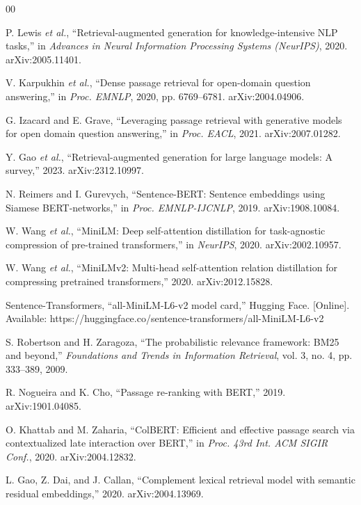 \documentclass[conference]{IEEEtran}
\begin{document}
\begin{thebibliography}{00}
\footnotesize

 P. Lewis \emph{et al.}, ``Retrieval-augmented generation for knowledge-intensive NLP tasks,'' in \emph{Advances in Neural Information Processing Systems (NeurIPS)}, 2020. arXiv:2005.11401.

 V. Karpukhin \emph{et al.}, ``Dense passage retrieval for open-domain question answering,'' in \emph{Proc. EMNLP}, 2020, pp. 6769--6781. arXiv:2004.04906.

 G. Izacard and E. Grave, ``Leveraging passage retrieval with generative models for open domain question answering,'' in \emph{Proc. EACL}, 2021. arXiv:2007.01282.

 Y. Gao \emph{et al.}, ``Retrieval-augmented generation for large language models: A survey,'' 2023. arXiv:2312.10997.

 N. Reimers and I. Gurevych, ``Sentence-BERT: Sentence embeddings using Siamese BERT-networks,'' in \emph{Proc. EMNLP-IJCNLP}, 2019. arXiv:1908.10084.

 W. Wang \emph{et al.}, ``MiniLM: Deep self-attention distillation for task-agnostic compression of pre-trained transformers,'' in \emph{NeurIPS}, 2020. arXiv:2002.10957.

 W. Wang \emph{et al.}, ``MiniLMv2: Multi-head self-attention relation distillation for compressing pretrained transformers,'' 2020. arXiv:2012.15828.

 Sentence-Transformers, ``all-MiniLM-L6-v2 model card,'' Hugging Face. [Online]. Available: https://huggingface.co/sentence-transformers/all-MiniLM-L6-v2

 S. Robertson and H. Zaragoza, ``The probabilistic relevance framework: BM25 and beyond,'' \emph{Foundations and Trends in Information Retrieval}, vol. 3, no. 4, pp. 333--389, 2009.

 R. Nogueira and K. Cho, ``Passage re-ranking with BERT,'' 2019. arXiv:1901.04085.

 O. Khattab and M. Zaharia, ``ColBERT: Efficient and effective passage search via contextualized late interaction over BERT,'' in \emph{Proc. 43rd Int. ACM SIGIR Conf.}, 2020. arXiv:2004.12832.

 L. Gao, Z. Dai, and J. Callan, ``Complement lexical retrieval model with semantic residual embeddings,'' 2020. arXiv:2004.13969.


\end{thebibliography}
\end{document}
